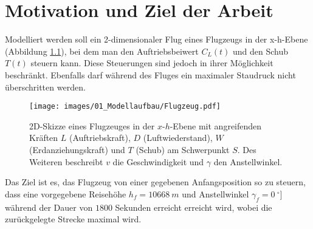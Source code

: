 \chapter{Motivation und Ziel der Arbeit}
Modelliert werden soll ein 2-dimensionaler Flug eines Flugzeugs in der x-h-Ebene (Abbildung \ref{img:Flugzeug}), bei dem man den Auftriebsbeiwert $C_L(t)$ und den Schub $T(t)$ steuern kann. Diese Steuerungen sind jedoch in ihrer Möglichkeit beschränkt. Ebenfalls darf während des Fluges ein maximaler Staudruck nicht überschritten werden.

\begin{figure}[H]
    \begin{center}
        \texttt{[image: images/01\_Modellaufbau/Flugzeug.pdf]}
        \caption{2D-Skizze eines Flugzeuges in der $x$-$h$-Ebene mit angreifenden Kräften $L$ (Auftriebskraft), $D$ (Luftwiederstand), $W$ (Erdanziehungskraft) und $T$ (Schub) am Schwerpunkt $S$. Des Weiteren beschreibt $v$ die Geschwindigkeit und $\gamma$ den Anstellwinkel.}\label{img:Flugzeug}
    \end{center}
\end{figure}

Das Ziel ist es, das Flugzeug von einer gegebenen Anfangsposition so zu steuern, dass eine vorgegebene Reisehöhe $h_f = 10668\ m$ und Anstellwinkel $\gamma_f = 0\ ^{\circ}]$ während der Dauer von $1800$ Sekunden erreicht erreicht wird, wobei die zurückgelegte Strecke maximal wird.
